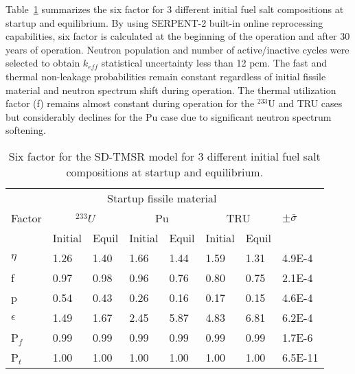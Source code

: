 Table~\ref{tab:six_factor} summarizes the six factor for 3 different initial 
fuel salt compositions at startup and equilibrium. By using SERPENT-2 built-in 
online reprocessing capabilities, six factor is calculated at the 
beginning of the operation and after 30 years of operation. Neutron population 
and number of active/inactive cycles were selected to obtain $k_{eff}$ 
statistical uncertainty less than 12 pcm. The fast and thermal non-leakage 
probabilities remain constant regardless of initial fissile material and 
neutron spectrum shift during operation. The thermal utilization factor (f) 
remains almost constant during operation for the $^{233}$U and TRU cases but 
considerably declines for the Pu case due to significant neutron spectrum 
softening.
\begin{table} [ht!]
	\caption{Six factor for the SD-TMSR model for 3 different initial 
		fuel salt compositions at startup and equilibrium.}
	\begin{tabularx}{\textwidth}{ X | X X  X X  X X | p{}} \hline
		\multirow{3}{*}{Factor}  & \multicolumn{6}{c|}{Startup fissile 
			material} & \multirow{3}{*}{$\pm\bar{\sigma}$} \\ 
			\cline{2-7}
		\space  & \multicolumn{2}{c}{$^{233}U$} & \multicolumn{2}{c}{Pu} & 
		\multicolumn{2}{c|}{TRU} \\ \cline{2-7}
		\space  & Initial & Equil & Initial & Equil & Initial & Equil & \space 
		\\ \hline
		$\eta$  & 1.26 & 1.40 & 1.66 & 1.44 & 1.59 & 1.31&4.9E-4\\ 
		f       & 0.97 & 0.98 & 0.96 & 0.76 & 0.80 & 0.75&2.1E-4 \\
		p       & 0.54 & 0.43 & 0.26 & 0.16 & 0.17 & 0.15&4.6E-4 \\
		$\epsilon$ & 1.49 & 1.67 & 2.45 & 5.87 & 4.83 & 6.81&6.2E-4 \\
		P$_f$   & 0.99 & 0.99 & 0.99 & 0.99& 0.99 & 0.99&1.7E-6 \\
		P$_t$   & 1.00 & 1.00 & 1.00 & 1.00 & 1.00 & 1.00&6.5E-11 \\ \hline
	\end{tabularx}
	\label{tab:six_factor}
\end{table}

